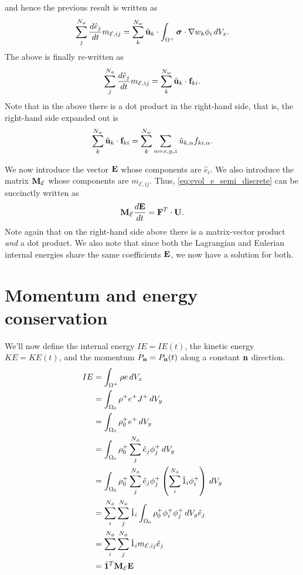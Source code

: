 \documentclass[11pt]{report}
\begin{document}
and hence the previous result is written as
\begin{equation*}
    \sum_j^{N_\phi} \frac{d \hat{e}_j}{dt} m_{\mathcal{E},ij} = \sum_k^{N_w} \hat{\mathbf{u}}_k \cdot \int_{\Omega^+} \bm \sigma \cdot \nabla w_k \phi_i \, dV_x.
\end{equation*}
The above is finally re-written as
\begin{equation}
    \label{eq:evol_e_semi_discrete}
    \sum_j^{N_\phi} \frac{d \hat{e}_j}{d t} m_{\mathcal{E},ij} = \sum_k^{N_w} \hat{\mathbf{u}}_k \cdot \mathbf{f}_{ki}.
\end{equation}
Note that in the above there is a dot product in the right-hand side, that is, the right-hand side expanded out is  
\begin{equation*}
    \sum_k^{N_w} \hat{\mathbf{u}}_k \cdot \mathbf{f}_{ki} = \sum_k^{N_w} \sum_{\alpha=x,y,z} \hat{u}_{k,\alpha} f_{ki,\alpha}.
\end{equation*}

We now introduce the vector $\mathbf{E}$ whose components are $\hat{e}_i$. We also introduce the matrix $\mathbf{M}_\mathcal{E}$ whose components are $m_{\mathcal{E},ij}$. Thus, \cref{eq:evol_e_semi_discrete} can be succinctly written as
\begin{equation}
    \label{eq:evol_energy_semi_discrete}
    \mathbf{M}_\mathcal{E} \frac{d\mathbf{E}}{dt} = \mathbf{F}^T \cdot \mathbf{U}.
\end{equation}
Note again that on the right-hand side above there is a matrix-vector product \textit{and} a dot product. We also note that since both the Lagrangian and Eulerian internal energies share the same coefficients $\mathbf{E}$, we now have a solution for both.

\section{Momentum and energy conservation}
We'll now define the internal energy $IE=IE(t)$, the kinetic energy $KE=KE(t)$, and the momentum $P_{\mathbf{n}}=P_{\mathbf{n}}(t)$ along a constant $\mathbf{n}$ direction.
\begin{align}
    IE &= \int_{\Omega^+} \rho e \, dV_x \nonumber \\
    &= \int_{\Omega_0} \rho^+ e^+ J^+ \, dV_y \nonumber \\
    &= \int_{\Omega_0} \rho^+_0 e^+ \, dV_y \nonumber \\
    &= \int_{\Omega_0} \rho_0^+ \sum_{j}^{N_\phi} \hat{e}_j \phi_j^+ \, dV_y \nonumber \\
    &= \int_{\Omega_0} \rho_0^+ \sum_{j}^{N_\phi} \hat{e}_j \phi_j^+ \left ( \sum_{i}^{N_\phi} \hat{1}_i \phi^+_i \right ) \, dV_y \nonumber \\
    &= \sum_i^{N_\phi} \sum_j^{N_\phi} \hat{1}_i \int_{\Omega_0} \rho_0^+ \phi_i^+ \phi_j^+ \, dV_y \hat{e}_j \nonumber \\
    &= \sum_i^{N_\phi} \sum_j^{N_\phi} \hat{1}_i m_{\mathcal{E},ij} \hat{e}_j \nonumber \\
    &= \hat{\mathbf{1}}^T \mathbf{M}_\mathcal{E} \mathbf{E} 
\end{align}
\end{document}
